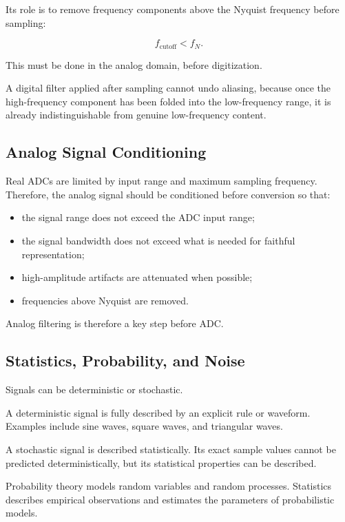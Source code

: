 Its role is to remove frequency components above the Nyquist frequency before sampling:

\[
f_{\text{cutoff}} < f_N.
\]

This must be done in the analog domain, before digitization.

\begin{authornote}
A digital filter applied after sampling cannot undo aliasing, because once the high-frequency component has been folded into the low-frequency range, it is already indistinguishable from genuine low-frequency content.
\end{authornote}

\subsection{Analog Signal Conditioning}

Real ADCs are limited by input range and maximum sampling frequency. Therefore, the analog signal should be conditioned before conversion so that:

\begin{itemize}[noitemsep]
    \item the signal range does not exceed the ADC input range;
    \item the signal bandwidth does not exceed what is needed for faithful representation;
    \item high-amplitude artifacts are attenuated when possible;
    \item frequencies above Nyquist are removed.
\end{itemize}

Analog filtering is therefore a key step before ADC.

\subsection{Statistics, Probability, and Noise}

Signals can be deterministic or stochastic.

A deterministic signal is fully described by an explicit rule or waveform. Examples include sine waves, square waves, and triangular waves.

A stochastic signal is described statistically. Its exact sample values cannot be predicted deterministically, but its statistical properties can be described.

Probability theory models random variables and random processes. Statistics describes empirical observations and estimates the parameters of probabilistic models.

